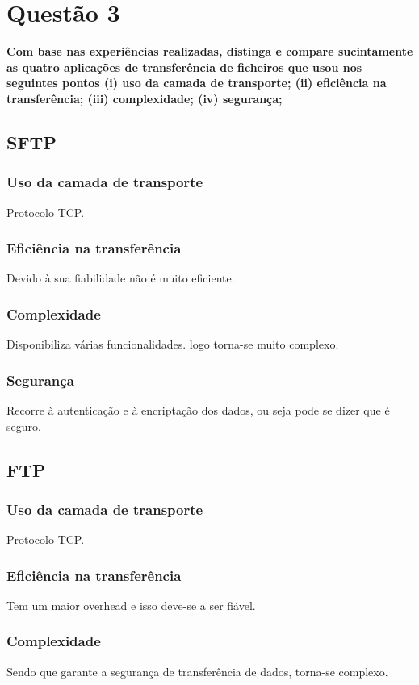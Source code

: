 \documentclass[a4paper]{report}
\begin{document}
\chapter{Questão 3}
\textbf{Com base nas experiências realizadas, distinga e compare sucintamente as
quatro aplicações de transferência de ficheiros que usou nos seguintes pontos
(i) uso da camada de transporte; (ii) eficiência na transferência; (iii)
complexidade; (iv) segurança;}

\section{SFTP}
\subsection{Uso da camada de transporte}
Protocolo TCP.

\subsection{Eficiência na transferência}
Devido à sua fiabilidade não é muito eficiente.

\subsection{Complexidade}
Disponibiliza várias funcionalidades. logo torna-se muito complexo.

\subsection{Segurança}
Recorre à autenticação e à encriptação dos dados, ou seja pode se dizer que é
seguro.

\section{FTP}
\subsection{Uso da camada de transporte}
Protocolo TCP.

\subsection{Eficiência na transferência}
Tem um maior overhead e isso deve-se a ser fiável.

\subsection{Complexidade}
Sendo que garante a segurança de transferência de dados, torna-se complexo.
\end{document}

